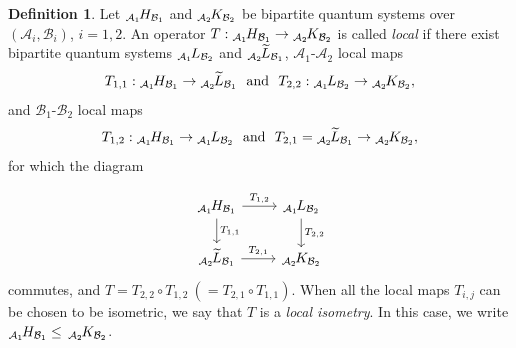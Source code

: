 \documentclass[11pt]{amsart}
\theoremstyle{definition}
\newtheorem{defn}[theorem]{Definition}
\newcommand{\cl}[1]{\mathcal{#1}}
\begin{document}
\begin{defn}\label{d:localiso} Let 
$_{\cl{A}_1}\hspace{-0.04cm}H_{\cl{B}_1}$ and 
$_{\cl{A}_2}\hspace{-0.04cm}K_{\cl{B}_2}$ be bipartite quantum systems over $(\cl{A}_i,\cl{B}_i)$, $i=1,2$. 
An operator $T : \mbox{}_{\cl{A}_1}\hspace{-0.04cm}H_{\cl{B}_1}\to \mbox{}_{\cl{A}_2}\hspace{-0.04cm}K_{\cl{B}_2}$ is 
called \textit{local} if there exist
bipartite quantum systems
$_{\cl{A}_1}\hspace{-0.04cm}L_{\cl{B}_2}$ and $_{\cl{A}_2}\hspace{-0.04cm}\widetilde{L}_{\cl{B}_1}$, $\cl{A}_1$-$\cl{A}_2$ local maps $$T_{1,1}: \mbox{}_{\cl{A}_1}\hspace{-0.04cm}H_{\cl{B}_1}\to \mbox{}_{\cl{A}_2}\hspace{-0.04cm}\widetilde{L}_{\cl{B}_1} \ 
\mbox{ and } \ 
T_{2,2}: \mbox{}_{\cl{A}_1}\hspace{-0.04cm}L_{\cl{B}_2}\to \mbox{}_{\cl{A}_2}\hspace{-0.04cm}K_{\cl{B}_2},$$ and $\cl{B}_1$-$\cl{B}_2$ local maps $$T_{1,2}: \mbox{}_{\cl{A}_1}\hspace{-0.04cm}H_{\cl{B}_1}\to \mbox{}_{\cl{A}_1}\hspace{-0.04cm}L_{\cl{B}_2} \ \mbox{ and } \ T_{2,1}= \mbox{}_{\cl{A}_2}\hspace{-0.04cm}\widetilde{L}_{\cl{B}_1}\to \mbox{}_{\cl{A}_2}\hspace{-0.04cm}K_{\cl{B}_2},$$
for which the diagram 

\begin{equation}\label{eq_diag!}
\begin{tikzcd}
_{\cl{A}_1}\hspace{-0.04cm}H_{\cl{B}_1}\arrow[d, "T_{1,1}"] \arrow[r, "T_{1,2}"] &_{\cl{A}_1}\hspace{-0.04cm}L_{\cl{B}_2}\arrow[d, "T_{2,2}"]\\
_{\cl{A}_2}\hspace{-0.04cm}\widetilde{L}_{\cl{B}_1} \arrow[r, "T_{2,1}"] &_{\cl{A}_2}\hspace{-0.04cm}K_{\cl{B}_2}
\end{tikzcd}
\end{equation}
commutes, and 
$T=T_{2,2}\circ T_{1,2} \ (=T_{2,1}\circ T_{1,1})$. When all the local maps $T_{i,j}$ can be chosen to be 
isometric, we say that $T$ is a \textit{local isometry}. In this case, we write $_{\cl{A}_1}\hspace{-0.04cm}H_{\cl{B}_1}\leq\, _{\cl{A}_2}\hspace{-0.04cm}K_{\cl{B}_2}$.
\end{defn}
\end{document}
